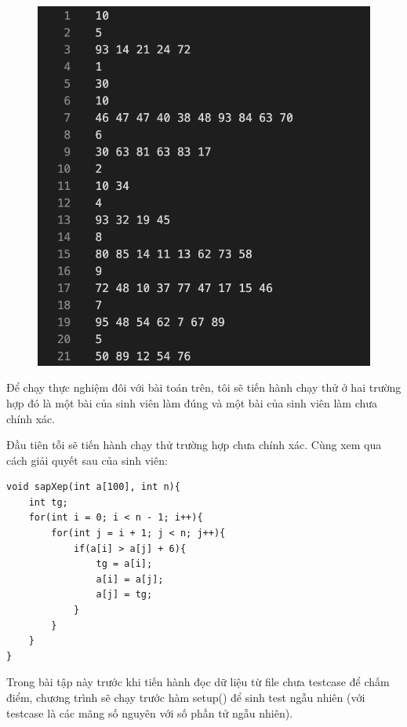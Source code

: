 \documentclass[12pt,a4paper]{article}
\begin{document}
\begin{figure}[ht]
\begin{center}
\includegraphics[scale=.3]{hinhanh/testcasearray.png}
\end{center}
\end{figure}

Để chạy thực nghiệm đôi với bài toán trên, tôi sẽ tiến hành chạy thử ở hai trường hợp đó là một bài của sinh viên làm đúng và một bài của sinh viên làm chưa chính xác.

Đầu tiên tỗi sẽ tiến hành chạy thử trường hợp chưa chính xác. Cùng xem qua cách giải quyết sau của sinh viên:

\begin{lstlisting}
void sapXep(int a[100], int n){
    int tg;
    for(int i = 0; i < n - 1; i++){
        for(int j = i + 1; j < n; j++){
            if(a[i] > a[j] + 6){
                tg = a[i];
                a[i] = a[j];
                a[j] = tg;        
            }
        }
    }
}
\end{lstlisting}

Trong bài tập này trước khi tiến hành đọc dữ liệu từ file chưa testcase để chấm điểm, chương trình sẽ chạy trước hàm setup() để sinh test ngẫu nhiên (với testcase là các mãng số nguyên với số phần tử ngẫu nhiên).
\end{document}
